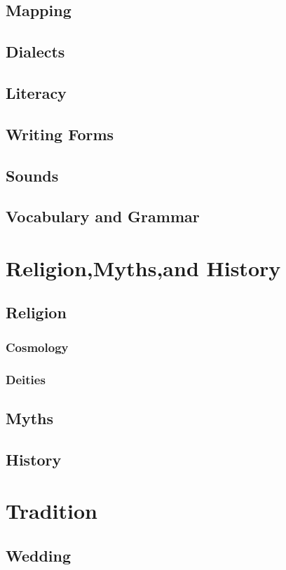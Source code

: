 \subsection{Mapping}
\subsection{Dialects}
\subsection{Literacy}
\subsection{Writing Forms}
\subsection{Sounds}
\subsection{Vocabulary and Grammar}

\section{Religion,Myths,and History}
\subsection{Religion}
\subsubsection{Cosmology}
\subsubsection{Deities}
\subsection{Myths}
\subsection{History}

\section{Tradition}
\subsection{Wedding}
